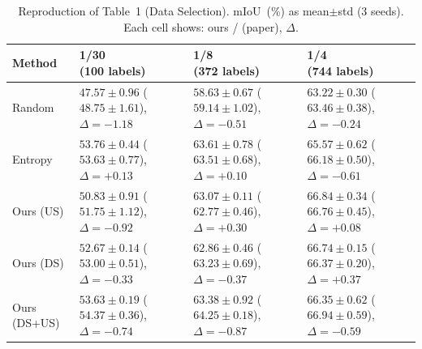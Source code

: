 \begin{table}[H]
\centering
\caption{Reproduction of Table~1 (Data Selection). mIoU~(\%) as
mean$\pm$std (3 seeds). Each cell shows: ours / {\scriptsize (paper)},
$\Delta$.}
\label{tab:table1_repro}
\renewcommand{\arraystretch}{1.6}
\small
\begin{tabularx}{\textwidth}{lXXX}
\toprule
\textbf{Method} &
\makecell[c]{\textbf{1/30} \\ \textbf{(100 labels)}} &
\makecell[c]{\textbf{1/8} \\ \textbf{(372 labels)}} &
\makecell[c]{\textbf{1/4} \\ \textbf{(744 labels)}} \\
\midrule
Random &
\makecell[c]{$47.57 \pm 0.96$ \\ {\scriptsize ($48.75 \pm 1.61$), $\Delta=-1.18$}} &
\makecell[c]{$58.63 \pm 0.67$ \\ {\scriptsize ($59.14 \pm 1.02$), $\Delta=-0.51$}} &
\makecell[c]{$63.22 \pm 0.30$ \\ {\scriptsize ($63.46 \pm 0.38$), $\Delta=-0.24$}} \\
Entropy &
\makecell[c]{$53.76 \pm 0.44$ \\ {\scriptsize ($53.63 \pm 0.77$), $\Delta=+0.13$}} &
\makecell[c]{$63.61 \pm 0.78$ \\ {\scriptsize ($63.51 \pm 0.68$), $\Delta=+0.10$}} &
\makecell[c]{$65.57 \pm 0.62$ \\ {\scriptsize ($66.18 \pm 0.50$), $\Delta=-0.61$}} \\
Ours (US) &
\makecell[c]{$50.83 \pm 0.91$ \\ {\scriptsize ($51.75 \pm 1.12$), $\Delta=-0.92$}} &
\makecell[c]{$63.07 \pm 0.11$ \\ {\scriptsize ($62.77 \pm 0.46$), $\Delta=+0.30$}} &
\makecell[c]{$66.84 \pm 0.34$ \\ {\scriptsize ($66.76 \pm 0.45$), $\Delta=+0.08$}} \\
Ours (DS) &
\makecell[c]{$52.67 \pm 0.14$ \\ {\scriptsize ($53.00 \pm 0.51$), $\Delta=-0.33$}} &
\makecell[c]{$62.86 \pm 0.46$ \\ {\scriptsize ($63.23 \pm 0.69$), $\Delta=-0.37$}} &
\makecell[c]{$66.74 \pm 0.15$ \\ {\scriptsize ($66.37 \pm 0.20$), $\Delta=+0.37$}} \\
Ours (DS+US) &
\makecell[c]{$53.63 \pm 0.19$ \\ {\scriptsize ($54.37 \pm 0.36$), $\Delta=-0.74$}} &
\makecell[c]{$63.38 \pm 0.92$ \\ {\scriptsize ($64.25 \pm 0.18$), $\Delta=-0.87$}} &
\makecell[c]{$66.35 \pm 0.62$ \\ {\scriptsize ($66.94 \pm 0.59$), $\Delta=-0.59$}} \\
\bottomrule
\end{tabularx}
\end{table}


